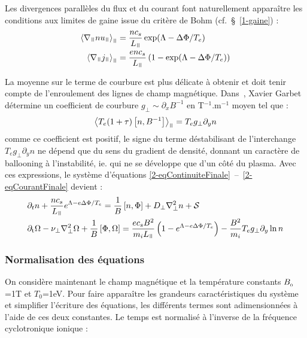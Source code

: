\begin{refsection}
Les divergences parallèles du flux et du
courant font naturellement apparaître
les conditions aux limites de gaine issue du critère de Bohm
(cf.~\S~\ref{1-gaine}) :
\begin{align}
\left<\nabla_\para
nu_\para\right>_\para&=\frac{nc_s}{L_\para}\exp(\Lambda-\Delta\Phi/T_e)
\\
\left<\nabla_\para
j_\para\right>_\para&=\frac{enc_s}{L_\para}\left(1-\exp(\Lambda-\Delta\Phi/T_e)\right)
\end{align}

La moyenne sur le terme de courbure est plus délicate à obtenir et doit tenir
compte de l'enroulement des lignes de champ magnétique. Dans~\parencite{Garbet},
Xavier Garbet détermine un coefficient de courbure
$g_\perp\sim\partial_xB^{-1}$ en T$^{-1}$.m$^{-1}$ moyen tel que :
\begin{equation}
\left<T_e(1+\tau)\left[n,B^{-1}\right]\right>_\para=T_eg_\perp\partial_yn
\end{equation}
comme ce coefficient est positif, le signe du terme déstabilisant
de l'interchange $T_eg_\perp\partial_yn$ ne dépend que du sens du gradient de
densité, donnant un caractère de ballooning à l'instabilité, ie. qui ne se développe que
d'un côté du plasma. Avec ces expressions, le système d'équations
\eqref{2-eqContinuiteFinale}~--~\eqref{2-eqCourantFinale} devient :
\begin{align}
\label{2-eqContinuiteMoyenne}
&\partial_t n + \frac{nc_s}{L_\para}e^{\Lambda-e\Delta \Phi/T_e} =
\frac{1}{B}\left[n,\Phi\right] + D_\perp\nabla^2_\perp n + \mathcal{S}\\
&\partial_\text{t}\Omega - \nu_\perp
\nabla_\perp^2\Omega+
\frac{1}{B}\left[\Phi,\Omega\right]=\frac{ec_sB^2}{m_iL_\para}\left(1-e^{\Lambda-e\Delta
\Phi/T_e}\right) -\frac{B^2}{m_i}T_eg_\perp\partial_y\ln n
\label{2-eqCourantMoyenne}
\end{align}
 
\subsubsection{Normalisation des équations}

On considère maintenant le champ magnétique et la température constants 
$B_{{_{0}}}$=1T et $T_0$=1eV.
Pour faire apparaître les grandeurs caractéristiques du système et simplifier
l'écriture des équations, les différents termes sont adimensionnées à
l'aide de ces deux constantes. Le temps est normalisé à l'inverse de la
fréquence cyclotronique ionique :


\end{refsection}
